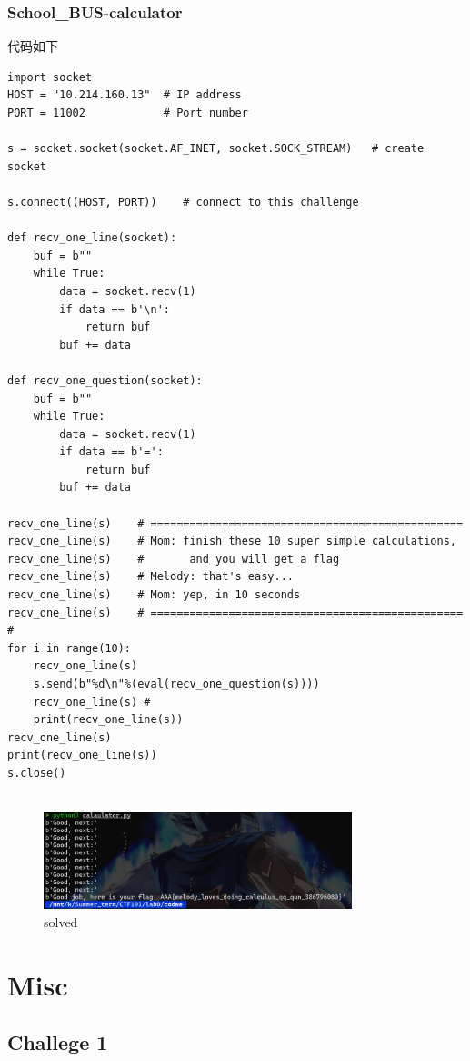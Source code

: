 \documentclass{article}
\begin{document}
          \subsubsection*{School_BUS-calculator}
          代码如下
        \begin{verbatim}
import socket
HOST = "10.214.160.13"  # IP address
PORT = 11002            # Port number

s = socket.socket(socket.AF_INET, socket.SOCK_STREAM)   # create socket

s.connect((HOST, PORT))    # connect to this challenge

def recv_one_line(socket):
    buf = b""
    while True:
        data = socket.recv(1)
        if data == b'\n':
            return buf
        buf += data

def recv_one_question(socket):
    buf = b""
    while True:
        data = socket.recv(1)
        if data == b'=':
            return buf
        buf += data
        
recv_one_line(s)    # ================================================
recv_one_line(s)    # Mom: finish these 10 super simple calculations,
recv_one_line(s)    #       and you will get a flag
recv_one_line(s)    # Melody: that's easy...
recv_one_line(s)    # Mom: yep, in 10 seconds
recv_one_line(s)    # ================================================   #
for i in range(10):
    recv_one_line(s) 
    s.send(b"%d\n"%(eval(recv_one_question(s))))
    recv_one_line(s) #        
    print(recv_one_line(s))
recv_one_line(s)
print(recv_one_line(s))
s.close()
            
        \end{verbatim}
    \begin{figure}[H]
        \centering
        \includegraphics[width=0.8\textwidth]{./figure/solved.png}
        \caption{solved}
     \end{figure} 
\section*{Misc}
\subsection*{Challege 1}
\end{document}
